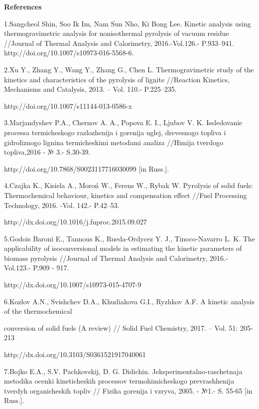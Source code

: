 \begin{center}
{\bfseries References}
\end{center}

\begin{noparindent}
1.Sangcheol Shin, Soo Ik Im, Nam Sun Nho, Ki Bong Lee. Kinetic analysis
using thermogravimetric analysis for nonisothermal pyrolysis of vacuum
residue //Journal of Thermal Analysis and Calorimetry, 2016.-Vol.126.-
P.933--941. http://doi.org/10.1007/s10973-016-5568-6.

2.Xu Y., Zhang Y., Wang Y., Zhang G., Chen L. Thermogravimetric study of
the kinetics and characteristics of the pyrolysis of lignite //Reaction
Kinetics, Mechanisms and Catalysis, 2013. -- Vol. 110.- P.225--235.

http://doi.org/10.1007/s11144-013-0586-x

3.Mar\textquotesingle jandyshev P.A., Chernov A. A., Popova E. I.,
Ljubov V. K. Issledovanie processa termicheskogo razlozhenija i gorenija
uglej, drevesnogo topliva i gidroliznogo lignina termicheskimi metodami
analiza //Himija tverdogo topliva,2016 - № 3.- S.30-39.

http://doi.org/10.7868/S0023117716030099 {[}in Russ.{]}.

4.Czajka K., Kisiela A., Moroń W., Ferens W., Rybak W. Pyrolysis of
solid fuels: Thermochemical behaviour, kinetics and compensation effect
//Fuel Processing Technology, 2016. -Vol. 142.- P.42--53.

http://dx.doi.org/10.1016/j.fuproc.2015.09.027

5.Godois Baroni E., Tannous K., Rueda-Ordycez Y. J., Tinoco-Navarro L.
K. The applicability of isoconversional models in estimating the kinetic
parameters of biomass pyrolysis //Journal of Thermal Analysis and
Calorimetry, 2016.- Vol.123.- P.909 - 917.

http://dx.doi.org/10.1007/s10973-015-4707-9

6.Kozlov A.N., Svishchev D.A., Khudiakova G.I., Ryzhkov A.F. A kinetic
analysis of the thermochemical

conversion of solid fuels (A review) //
Solid Fuel Chemistry, 2017. -- Vol. 51: 205-213

http://dx.doi.org/10.3103/S0361521917040061

7.Bojko E.A., S.V. Pachkovskij, D. G. Didichin.
Jeksperimental\textquotesingle no-raschetnaja metodika ocenki
kineticheskih processov termohimicheskogo prevrashhenija tverdyh
organicheskih topliv // Fizika gorenija i vzryva, 2005. - №1.- S. 55-65
{[}in Russ.{]}.


\end{noparindent}

